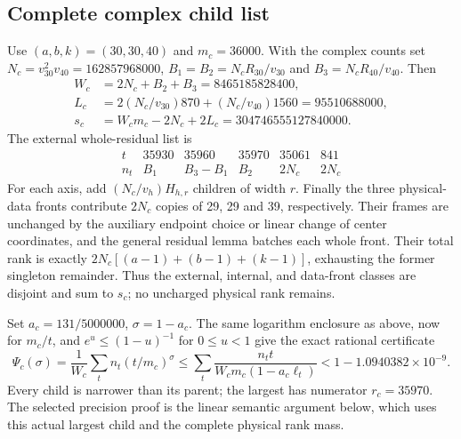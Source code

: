 \subsection{Complete complex child list}
Use $(a,b,k)=(30,30,40)$ and $m_c=36000$. With the complex counts set
$N_c=v_{30}^2v_{40}=162857968000$,
$B_1=B_2=N_cR_{30}/v_{30}$ and $B_3=N_cR_{40}/v_{40}$. Then
\[
\begin{aligned}
 W_c&=2N_c+B_2+B_3=8465185828400,\\
 L_c&=2(N_c/v_{30})870+(N_c/v_{40})1560=95510688000,\\
 s_c&=W_cm_c-2N_c+2L_c=304746555127840000.
\end{aligned}
\]
The external whole-residual list is
\[
\begin{array}{c|rrrrr}
t&35930&35960&35970&35061&841\\\hline
n_t&B_1&B_3-B_1&B_2&2N_c&2N_c
\end{array}
\]
For each axis, add $(N_c/v_h)H_{h,r}$ children of width $r$.
Finally the three physical-data fronts contribute $2N_c$ copies of
29, 29 and 39, respectively. Their frames are unchanged by the auxiliary
endpoint choice or linear change of center coordinates, and the general
residual lemma batches each whole front. Their total rank is exactly
$2N_c[(a-1)+(b-1)+(k-1)]$, exhausting the former singleton remainder.
Thus the external, internal, and data-front classes are disjoint and
sum to $s_c$; no uncharged physical rank remains.

Set $a_c=131/5000000$, $\sigma=1-a_c$. The same logarithm enclosure
as above, now for $m_c/t$, and $e^u\le(1-u)^{-1}$ for $0\le u<1$
give the exact rational certificate
\[
 \Psi_c(\sigma)=\frac1{W_c}\sum_tn_t(t/m_c)^\sigma
 \le\sum_t\frac{n_tt}{W_cm_c(1-a_c\ell_t)}
 <1-1.0940382\times10^{-9}.
\]
Every child is narrower than its parent; the largest has numerator
$r_c=35970$. The selected precision proof is the linear semantic
argument below, which uses this actual largest child and the complete
physical rank mass.
